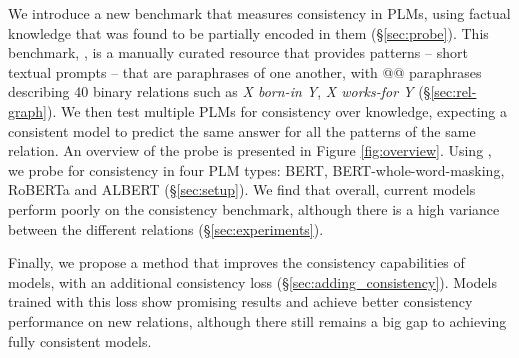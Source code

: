 We introduce a new benchmark that measures consistency in PLMs, using factual knowledge that was found to be partially encoded in them (\S \ref{sec:probe}).
This benchmark, \resource{}, is a manually curated resource
that provides patterns -- short textual prompts -- that are paraphrases of one another, with @@ paraphrases describing 40 binary relations such as \textit{X born-in Y}, \textit{X works-for Y} (\S \ref{sec:rel-graph}).
We then test multiple PLMs for consistency over knowledge, 
expecting a consistent model to predict the same answer for all the patterns of the same relation.
An overview of the probe is presented in Figure \ref{fig:overview}.
Using \resource{}, we probe for consistency in four PLM types: BERT, BERT-whole-word-masking, RoBERTa and ALBERT (\S \ref{sec:setup}).
We find that overall, current models perform poorly on the consistency benchmark, although there is a high variance between the different relations (\S \ref{sec:experiments}). 

Finally, we propose a method that improves the consistency capabilities of models, with an additional consistency loss (\S \ref{sec:adding_consistency}). Models trained with this loss show promising results and achieve better consistency performance on new relations, although there still remains a big gap to achieving fully consistent models.






